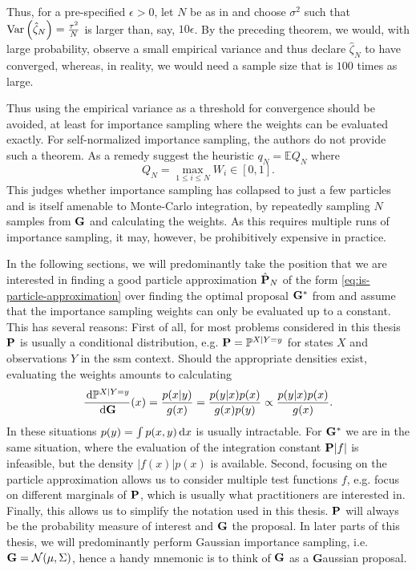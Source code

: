 Thus, for a pre-specified $\epsilon > 0$, let $N$ be as in  and choose $\sigma^{2}$ such that $\var \left( \hat\zeta_{N} \right) = \frac {\tau^{2}}N$ is larger than, say, $10\epsilon$. By the preceding theorem, we would, with large probability, observe a small empirical variance and thus declare $\hat\zeta_{N}$ to have converged, whereas, in reality, we would need a sample size that is $100$ times as large.

Thus using the empirical variance as a threshold for convergence should be avoided, at least for importance sampling where the weights can be evaluated exactly. For self-normalized importance sampling, the authors do not provide such a theorem. As a remedy \citep{Chatterjee2018Sample} suggest the heuristic $q_{N} = \mathbb E Q_{N}$ where
$$
Q_{N} = \max_{1\leq i\leq N} W_{i} \in [0, 1].
$$
This judges whether importance sampling has collapsed to just a few particles and is itself amenable to Monte-Carlo integration, by repeatedly sampling $N$ samples from $\G$ and calculating the weights. 
As this requires multiple runs of importance sampling, it may, however, be prohibitively expensive in practice.

In the following sections, we will predominantly take the position that we are interested in finding a good particle approximation $\hat\P_{N}$ of the form \eqref{eq:is-particle-approximation} over finding the optimal proposal $\G^{\ast}$ from  and assume that the importance sampling weights can only be evaluated up to a constant. 
This has several reasons: First of all, for most problems considered in this thesis $\P$ is usually a conditional distribution, e.g. $\P = \mathbb P^{X|Y=y}$ for states $X$ and observations $Y$ in the \gls{ssm} context. Should the appropriate densities exist, evaluating the weights amounts to calculating 
$$
\rnd{\mathbb P^{X| Y= y}}{\G}(x) = \frac{p(x|y)}{g(x)} = \frac{p(y|x)p(x)}{g(x)p(y)} \propto \frac{p(y|x)p(x)}{g(x)}.
$$
In these situations $p(y) = \int p(x,y)\d x$ is usually intractable. For $\G^{\ast}$ we are in the same situation, where the evaluation of the integration constant $\P \lvert f \rvert$ is infeasible, but the density $\lvert f(x)\rvert p(x)$ is available.
Second, focusing on the particle approximation allows us to consider multiple test functions $f$, e.g. focus on different marginals of $\P$, which is usually what practitioners are interested in.
Finally, this allows us to simplify the notation used in this thesis. $\P$ will always be the probability measure of interest and $\G$ the proposal. In later parts of this thesis, we will predominantly perform Gaussian importance sampling, i.e. $\G = \mathcal N(\mu, \Sigma)$, hence a handy mnemonic is to think of $\G$ as a \textbf{G}aussian proposal.

